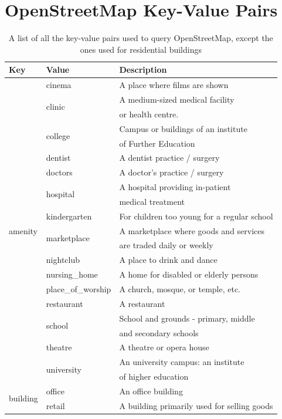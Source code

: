 \section{OpenStreetMap Key-Value Pairs}\label{sec:kv}
\begin{table}[H]
\caption{A list of all the key-value pairs used to query OpenStreetMap, except the ones used for residential buildings \label{OSM}}
\begin{tabular}{l l l}
\toprule
\textbf{Key} & \textbf{Value} & \textbf{Description} \\
\midrule
\multirow{21}{*}{amenity} & cinema & A place where films are shown \\
& \multirow{2}{*}{clinic} & A medium-sized medical facility \\
& & or health centre. \\
& \multirow{2}{*}{college} & Campus or buildings of an institute \\
& & of Further Education \\
& dentist & A dentist practice / surgery \\
& doctors &  A doctor's practice / surgery \\
& \multirow{2}{*}{hospital} & A hospital providing in-patient \\
& & medical treatment \\
& kindergarten & For children too young for a regular school \\
& \multirow{2}{*}{marketplace} & A marketplace where goods and services \\
& & are traded daily or weekly \\
& nightclub & A place to drink and dance \\
& nursing\_home & A home for disabled or elderly persons \\
& place\_of\_worship &  A church, mosque, or temple, etc. \\
& restaurant & A restaurant \\
& \multirow{2}{*}{school} & School and grounds - primary, middle \\
& & and secondary schools \\
& theatre & A theatre or opera house \\
& \multirow{2}{*}{university} & An university campus: an institute \\
& & of higher education\\
\midrule 
\multirow{3}{*}{building} & office & An office building \\
& \multirow{2}{*}{retail} & A building primarily used for selling goods \\

\end{tabular}
\end{table}
